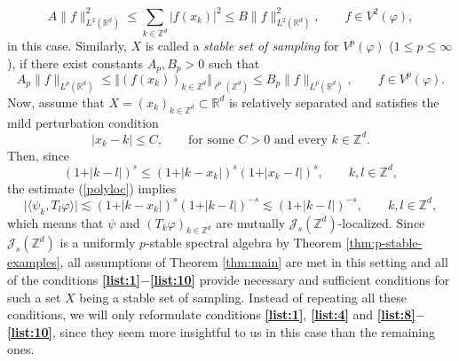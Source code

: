 \documentclass{amsart}
\newcommand{\R}[0]{{\mathbb{R}}}
\newcommand{\Z}[0]{{\mathbb{Z}}}
\newcommand{\J}[0]{{\mathcal{J}}}
\begin{document}
$$A\|f\|_{L^2(\mathbb{R}^d)}^2\leq \sum_{k\in\Z^d}|f(x_k)|^2\leq  B\|f\|_{L^2(\mathbb{R}^d)}^2,\qquad f\in V^2(\varphi),$$
in this case. Similarly, $X$ is called a \textit{stable set of sampling} for $V^p(\varphi)$ ($1\leq p\leq \infty$), if there exist constants $A_p,B_p >0$ such that 
$$A_p\|f\|_{L^p(\mathbb{R}^d)}\leq \Vert (f(x_k))_{k\in \Z^d} \Vert_{\ell^p(\Z^d)} \leq  B_p \|f\|_{L^p(\mathbb{R}^d)} ,\qquad f\in V^p(\varphi) .$$
Now, assume that $X=(x_k)_{k\in \mathbb{Z}^d} \subset \R^d$ is relatively separated and satisfies the mild perturbation condition
\begin{equation}\label{pert}
\vert x_k -k\vert \leq C,\qquad\text{for some }C>0\text{ and every }k\in\Z^d. 
\end{equation}
Then, since 
$$(1+\vert k-l\vert)^s \leq (1+\vert k-x_k\vert)^s (1+\vert x_k-l\vert)^s, \qquad  k,l\in \mathbb{Z}^d,$$
the estimate (\ref{polyloc}) implies
$$\vert \langle \psi_k, T_l\varphi \rangle \vert \lesssim (1+\vert k-x_k\vert)^{s}(1+\vert k-l\vert)^{-s} \lesssim (1+\vert k-l\vert)^{-s}, \qquad k,l\in \mathbb{Z}^d,$$
which means that $\psi$ and $(T_k\varphi)_{k\in \mathbb{Z}^d}$ are mutually $\J_s(\mathbb{Z}^d)$-localized. Since \(\mathcal J_s(\mathbb Z^d)\) is a uniformly $p$-stable spectral algebra by Theorem \ref{thm:p-stable-examples},
all assumptions of Theorem \ref{thm:main} are met in this setting and all of the conditions \textbf{\ref{list:1}$-$\ref{list:10}} provide necessary and sufficient conditions for such a set $X$ being a stable set of sampling. Instead of repeating all these conditions, we will only reformulate conditions \textbf{\ref{list:1}}, \textbf{\ref{list:4}} and \textbf{\ref{list:8}$-$\ref{list:10}}, since they seem more insightful to us in this case than the remaining ones.
\end{document}

